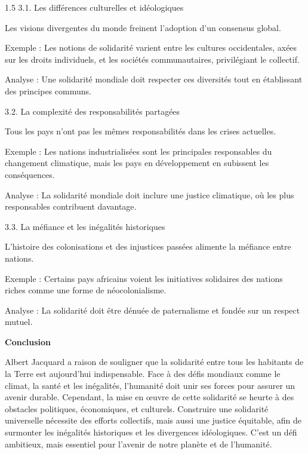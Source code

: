 \documentclass[12pt]{article}
\begin{document}
\begin{spacing}{1.5}
3.1. Les différences culturelles et idéologiques

Les visions divergentes du monde freinent l'adoption d'un consensus global.

Exemple : Les notions de solidarité varient entre les cultures occidentales, axées sur les droits individuels, et les sociétés communautaires, privilégiant le collectif.

Analyse : Une solidarité mondiale doit respecter ces diversités tout en établissant des principes communs.

3.2. La complexité des responsabilités partagées

Tous les pays n'ont pas les mêmes responsabilités dans les crises actuelles.

Exemple : Les nations industrialisées sont les principales responsables du changement climatique, mais les pays en développement en subissent les conséquences.

Analyse : La solidarité mondiale doit inclure une justice climatique, où les plus responsables contribuent davantage.

3.3. La méfiance et les inégalités historiques

L'histoire des colonisations et des injustices passées alimente la méfiance entre nations.

Exemple : Certains pays africains voient les initiatives solidaires des nations riches comme une forme de néocolonialisme.

Analyse : La solidarité doit être dénuée de paternalisme et fondée sur un respect mutuel.

\textbf{Conclusion}

Albert Jacquard a raison de souligner que la solidarité entre tous les habitants de la Terre est aujourd'hui indispensable. Face à des défis mondiaux comme le climat, la santé et les inégalités, l'humanité doit unir ses forces pour assurer un avenir durable. Cependant, la mise en œuvre de cette solidarité se heurte à des obstacles politiques, économiques, et culturels. Construire une solidarité universelle nécessite des efforts collectifs, mais aussi une justice équitable, afin de surmonter les inégalités historiques et les divergences idéologiques. C'est un défi ambitieux, mais essentiel pour l'avenir de notre planète et de l'humanité.





















\end{spacing}
\end{document}
